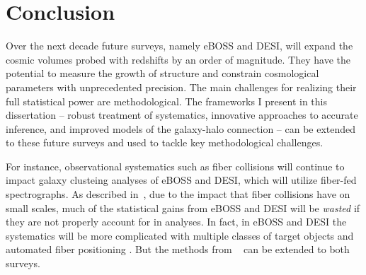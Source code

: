 \chapter*{Conclusion}
%
%
%
%
%
%

Over the next decade future surveys, namely eBOSS and DESI, will expand the 
cosmic volumes probed with redshifts by an order of magnitude. They have the 
potential to measure the growth of structure and constrain cosmological 
parameters with unprecedented precision. The main challenges for realizing 
their full statistical power are methodological. The frameworks I present
in this dissertation -- robust treatment of systematics, innovative approaches 
to accurate inference, and improved models of the galaxy-halo connection -- can be 
extended to these future surveys and used to tackle key methodological 
challenges. 

For instance, observational systematics such as fiber collisions will continue 
to impact galaxy clusteing analyses of eBOSS and DESI, which will utilize 
fiber-fed spectrographs. As described in~, due to the impact that fiber 
collisions have on small scales, much of the statistical gains from eBOSS and 
DESI will be {\em wasted} if they are not properly account for in analyses. 
In fact, in eBOSS and DESI the systematics will be more complicated with multiple 
classes of target objects and automated fiber positioning 
\citep{Cahn:2015_desifib, Dawson:2015aa}. But the methods from ~ 
can be extended to both surveys.

